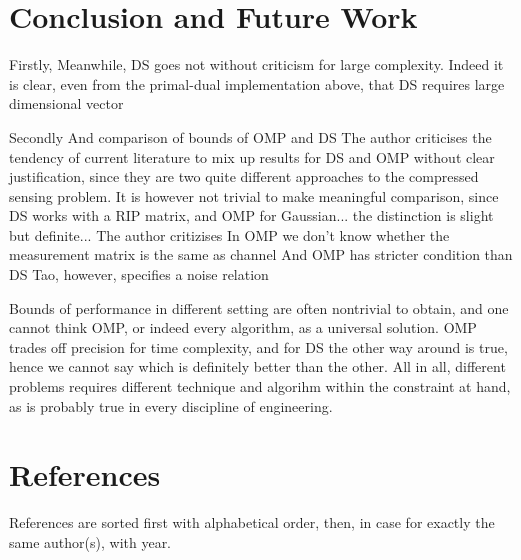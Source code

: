 \documentclass[12pt]{article}
\begin{document}

\section{Conclusion and Future Work}

Firstly,
Meanwhile, DS goes not without criticism for large complexity.
Indeed it is clear, even from the primal-dual implementation above, that DS requires large dimensional vector

Secondly
And comparison of bounds of OMP and DS
The author criticises the tendency of current literature to mix up results for DS and OMP without clear justification, since they are two quite different approaches to the compressed sensing problem.
It is however not trivial to make meaningful comparison, since DS works with a RIP matrix, and OMP for Gaussian... the distinction is slight but definite...
The author critizises In OMP we don't know whether the measurement matrix is the same as channel
And OMP has stricter condition than DS
Tao, however, specifies a noise relation

Bounds of performance in different setting are often nontrivial to obtain, and one cannot think OMP, or indeed every algorithm, as a universal solution.
OMP trades off precision for time complexity, and for DS the other way around is true, hence we cannot say which is definitely better than the other.
All in all, different problems requires different technique and algorihm within the constraint at hand, as is probably true in every discipline of engineering.

\section{References}

References are sorted first with alphabetical order, then, in case for exactly the same author(s), with year.
\end{document}
